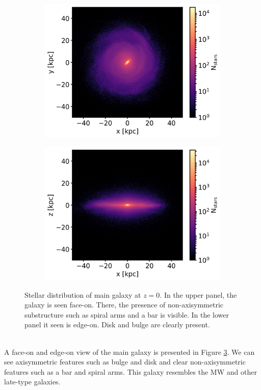 \begin{figure}[htbp]
\captionsetup{format=plain}
    \centering
    \begin{subfigure}[b]{0.8\textwidth}
	    \includegraphics[width=\textwidth]{plots/Auriga/Au24_stars_xy_distribution_halo0_zoomin.png}
	    \label{fig:Au24_stars_xy_zoomin}
    \end{subfigure}
    
    \begin{subfigure}[b]{0.8\textwidth}
    \centering
    	\includegraphics[width=\textwidth]{plots/Auriga/Au24_stars_xz_distribution_halo0_zoomin.png}
    	\label{fig:Au24_stars_xz_zoomin}
    \end{subfigure}
    \caption{Stellar distribution of main galaxy at $\textit{z}=0$. In the upper panel, the galaxy is seen face-on. There, the presence of non-axisymmetric substructure such as spiral arms and a bar is visible. In the lower panel it seen is edge-on. Disk and bulge are clearly present.}\label{fig:Stars_AU24_zoomin}
\end{figure}
\\A face-on and edge-on view of the main galaxy is presented in Figure \ref{fig:Stars_AU24_zoomin}. We can see axisymmetric features such as bulge and disk and clear non-axisymmetric features such as a bar and spiral arms. This galaxy resembles the \ac{MW} and other late-type galaxies.
